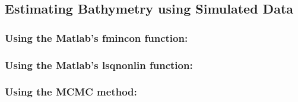 \subsection{Estimating Bathymetry using Simulated Data}

\subsubsection{Using the Matlab's fmincon function: }

\subsubsection{Using the Matlab's lsqnonlin function: }

\subsubsection{Using the MCMC method: }